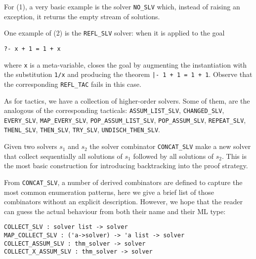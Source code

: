 For (1), a very basic example is the solver \verb|NO_SLV| which,
instead of raising an exception, it returns the empty stream of
solutions.

One example of (2) is the \verb|REFL_SLV| solver: when it is applied
to the goal
\begin{verbatim}
?- x + 1 = 1 + x
\end{verbatim}
where \verb|x| is a meta-variable, closes the goal by augmenting the
instantiation with the substitution \verb|1/x| and
producing the theorem \verb!|- 1 + 1 = 1 + 1!.  Observe that the
corresponding \verb|REFL_TAC| fails in this case.

As for tactics, we have a collection of higher-order solvers.  Some of
them, are the analogous of the corresponding tacticals:
\verb|ASSUM_LIST_SLV|,
\verb|CHANGED_SLV|,
\verb|EVERY_SLV|,
\verb|MAP_EVERY_SLV|,
\verb|POP_ASSUM_LIST_SLV|,
\verb|POP_ASSUM_SLV|,
\verb|REPEAT_SLV|,
\verb|THENL_SLV|,
\verb|THEN_SLV|,
\verb|TRY_SLV|,
\verb|UNDISCH_THEN_SLV|.


Given two solvers $s_1$ and $s_2$ the solver combinator
\verb|CONCAT_SLV| make a new solver that collect sequentially all
solutions of $s_1$ followed by all solutions of $s_2$.  This is the
most basic construction for introducing backtracking into the proof
strategy.

From \verb|CONCAT_SLV|, a number of derived combinators are defined to
capture the most common enumeration patterns, here
we give a brief list of those combinators without an explicit
description. However, we hope that the reader can guess the actual
behaviour from both their name and their ML type:
\begin{verbatim}
COLLECT_SLV : solver list -> solver
MAP_COLLECT_SLV : ('a->solver) -> 'a list -> solver
COLLECT_ASSUM_SLV : thm_solver -> solver
COLLECT_X_ASSUM_SLV : thm_solver -> solver
\end{verbatim}


